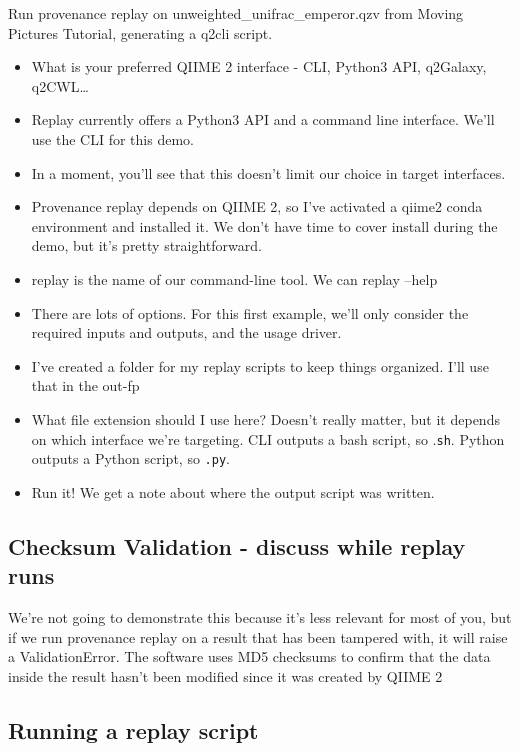 \noindent Run provenance replay on unweighted\_unifrac\_emperor.qzv from Moving Pictures
Tutorial, generating a q2cli script.

\begin{itemize}
    \item What is your preferred QIIME 2 interface - CLI, Python3 API, q2Galaxy, q2CWL…
    \item Replay currently offers a Python3 API and a command line interface. We’ll use the CLI for this demo.
    \item In a moment, you’ll see that this doesn’t limit our choice in target interfaces.
    \item Provenance replay depends on QIIME 2, so I’ve activated a qiime2 conda environment and installed it. We don’t have time to cover install during the demo, but it’s pretty straightforward.
    \item replay is the name of our command-line tool. We can replay –help
    \item There are lots of options. For this first example, we’ll only consider the required inputs and outputs, and the usage driver.
    \item I’ve created a folder for my replay scripts to keep things organized. I’ll use that in the out-fp
    \item What file extension should I use here? Doesn’t really matter, but it depends on which interface we’re targeting. CLI outputs a bash script, so .\texttt{sh}. Python outputs a Python script, so \texttt{.py}.
    \item Run it! We get a note about where the output script was written.
\end{itemize}

\subsection*{Checksum Validation - discuss while replay runs}

We’re not going to demonstrate this because it’s less relevant for most of you,
but if we run provenance replay on a result that has been tampered with, it will
raise a ValidationError. The software uses MD5 checksums to confirm that the
data inside the result hasn’t been modified since it was created by QIIME 2

\subsection*{Running a replay script}

